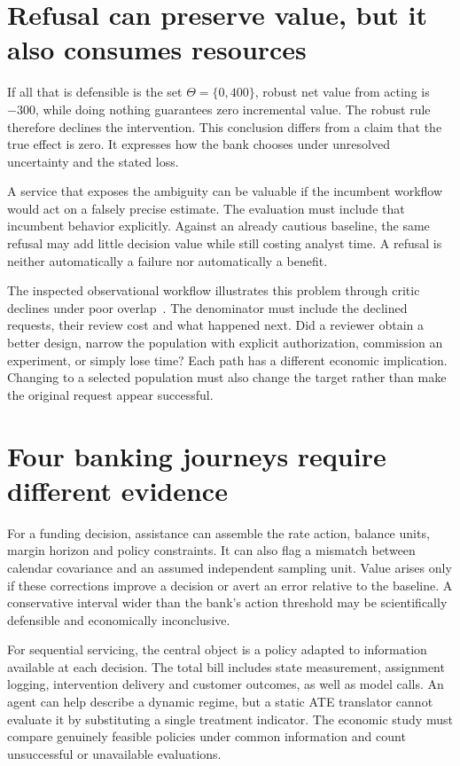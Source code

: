 \section{Refusal can preserve value, but it also consumes resources}

If all that is defensible is the set $\Theta=\{0,400\}$, robust net value from
acting is $-300$, while doing nothing guarantees zero incremental value.
The robust rule therefore declines the intervention. This conclusion differs
from a claim that the true effect is zero. It expresses how the bank chooses
under unresolved uncertainty and the stated loss.

A service that exposes the ambiguity can be valuable if the incumbent workflow
would act on a falsely precise estimate. The evaluation must include that
incumbent behavior explicitly. Against an already cautious baseline, the same
refusal may add little decision value while still costing analyst time. A
refusal is neither automatically a failure nor automatically a benefit.

The inspected observational workflow illustrates this problem through critic
declines under poor overlap~\citep{v12_la_2607_22443}. The denominator must include
the declined requests, their review cost and what happened next. Did a reviewer
obtain a better design, narrow the population with explicit authorization,
commission an experiment, or simply lose time? Each path has a different
economic implication. Changing to a selected population must also change the
target rather than make the original request appear successful.

\section{Four banking journeys require different evidence}

For a funding decision, assistance can assemble the rate action, balance units,
margin horizon and policy constraints. It can also flag a mismatch between
calendar covariance and an assumed independent sampling unit. Value arises
only if these corrections improve a decision or avert an error relative to the
baseline. A conservative interval wider than the bank's action threshold may
be scientifically defensible and economically inconclusive.

For sequential servicing, the central object is a policy adapted to information
available at each decision. The total bill includes state measurement,
assignment logging, intervention delivery and customer outcomes, as well as
model calls. An agent can help describe a dynamic regime, but a static ATE
translator cannot evaluate it by substituting a single treatment indicator.
The economic study must compare genuinely feasible policies under common
information and count unsuccessful or unavailable evaluations.

